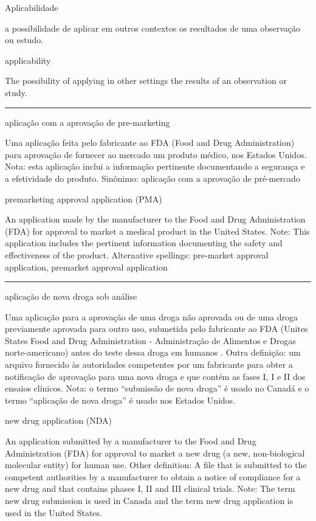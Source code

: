 \documentclass[
  openany]{book}
\begin{document}
Aplicabilidade

a possibilidade de aplicar em outros contextos os resultados de uma observação ou estudo.

applicability

The possibility of applying in other settings the results of an observation or study.

\begin{center}\rule{0.5\linewidth}{0.5pt}\end{center}

aplicação com a aprovação de pre-marketing

Uma aplicação feita pelo fabricante ao FDA (Food and Drug Administration) para aprovação de fornecer ao mercado um produto médico, nos Estados Unidos. Nota: esta aplicação inclui a informação pertinente documentando a segurança e a efetividade do produto. Sinônimo: aplicação com a aprovação de pré-mercado

premarketing approval application (PMA)

An application made by the manufacturer to the Food and Drug Administration (FDA) for approval to market a medical product in the United States. Note: This application includes the pertinent information documenting the safety and effectiveness of the product. Alternative spellings: pre-market approval application, premarket approval application

\begin{center}\rule{0.5\linewidth}{0.5pt}\end{center}

aplicação de nova droga sob análise

Uma aplicação para a aprovação de uma droga não aprovada ou de uma droga previamente aprovada para outro uso, submetida pelo fabricante ao FDA (Unites States Food and Drug Administration - Administração de Alimentos e Drogas norte-americano) antes do teste dessa droga em humanos . Outra definição: um arquivo fornecido às autoridades competentes por um fabricante para obter a notificação de aprovação para uma nova droga e que contém as fases I, I e II dos ensaios clínicos. Nota: o termo ``submissão de nova droga'' é usado no Canadá e o termo ``aplicação de nova droga'' é usado nos Estados Unidos.

new drug application (NDA)

An application submitted by a manufacturer to the Food and Drug Administration (FDA) for approval to market a new drug (a new, non-biological molecular entity) for human use. Other definition: A file that is submitted to the competent authorities by a manufacturer to obtain a notice of compliance for a new drug and that contains phases I, II and III clinical trials. Note: The term new drug submission is used in Canada and the term new drug application is used in the United States.
\end{document}

